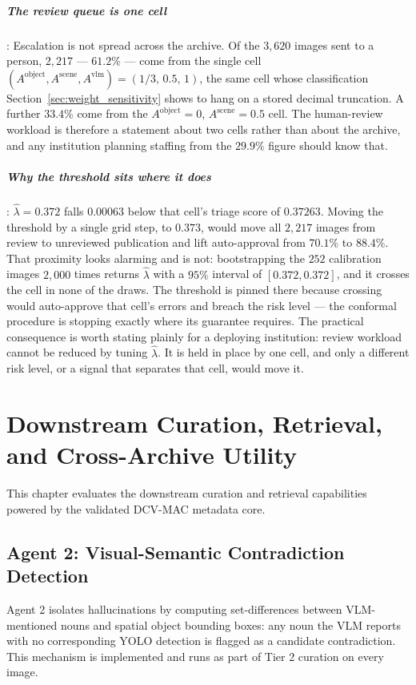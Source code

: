 \documentclass[12pt,a4paper]{report}
\begin{document}
\paragraph{The review queue is one cell}: Escalation is not spread across the archive.
Of the $3{,}620$ images sent to a person, $2{,}217$ --- $61.2\%$ --- come from the single cell
$(A^{\text{object}}, A^{\text{scene}}, A^{\text{vlm}}) = (1/3,\,0.5,\,1)$, the same cell whose
classification Section~\ref{sec:weight_sensitivity} shows to hang on a stored decimal
truncation. A further $33.4\%$ come from the $A^{\text{object}}=0$, $A^{\text{scene}}=0.5$
cell. The human-review workload is therefore a statement about two cells rather than about
the archive, and any institution planning staffing from the $29.9\%$ figure should know that.

\paragraph{Why the threshold sits where it does}: $\hat\lambda = 0.372$ falls $0.00063$ below
that cell's triage score of $0.37263$. Moving the threshold by a single grid step, to $0.373$,
would move all $2{,}217$ images from review to unreviewed publication and lift auto-approval
from $70.1\%$ to $88.4\%$. That proximity looks alarming and is not: bootstrapping the $252$
calibration images $2{,}000$ times returns $\hat\lambda$ with a $95\%$ interval of
$[0.372, 0.372]$, and it crosses the cell in none of the draws. The threshold is pinned there
because crossing would auto-approve that cell's errors and breach the risk level --- the
conformal procedure is stopping exactly where its guarantee requires. The practical
consequence is worth stating plainly for a deploying institution: review workload cannot be
reduced by tuning $\hat\lambda$. It is held in place by one cell, and only a different risk
level, or a signal that separates that cell, would move it.

\chapter{Downstream Curation, Retrieval, and Cross-Archive Utility}
\label{ch:downstream_utility}

This chapter evaluates the downstream curation and retrieval capabilities powered by the validated DCV-MAC metadata core.

\section{Agent 2: Visual-Semantic Contradiction Detection}
\label{sec:agent2_contradiction}
Agent 2 isolates hallucinations by computing set-differences between VLM-mentioned nouns and spatial object bounding boxes: any noun the VLM reports with no corresponding YOLO detection is flagged as a candidate contradiction. This mechanism is implemented and runs as part of Tier 2 curation on every image.
\end{document}
